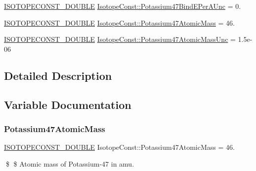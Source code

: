 \begin{DoxyCompactItemize}
\mbox{\hyperlink{group___isotope_const-_macros_ga8f45a7272ce02c0b4c65c44636ed719a}{I\+S\+O\+T\+O\+P\+E\+C\+O\+N\+S\+T\+\_\+\+D\+O\+U\+B\+LE}} \mbox{\hyperlink{group___isotope_const-_potassium-_k47_gac34246af7e8bab4413ad3e28bdc308e8}{Isotope\+Const\+::\+Potassium47\+Bind\+E\+Per\+A\+Unc}} = 0.
\item 
\mbox{\hyperlink{group___isotope_const-_macros_ga8f45a7272ce02c0b4c65c44636ed719a}{I\+S\+O\+T\+O\+P\+E\+C\+O\+N\+S\+T\+\_\+\+D\+O\+U\+B\+LE}} \mbox{\hyperlink{group___isotope_const-_potassium-_k47_ga84aa1ff7506fffd86041f55d348d7e75}{Isotope\+Const\+::\+Potassium47\+Atomic\+Mass}} = 46.
\item 
\mbox{\hyperlink{group___isotope_const-_macros_ga8f45a7272ce02c0b4c65c44636ed719a}{I\+S\+O\+T\+O\+P\+E\+C\+O\+N\+S\+T\+\_\+\+D\+O\+U\+B\+LE}} \mbox{\hyperlink{group___isotope_const-_potassium-_k47_ga80526d0cd2c6d0be10d2cdee913f8df7}{Isotope\+Const\+::\+Potassium47\+Atomic\+Mass\+Unc}} = 1.\+5e-\/06
\end{DoxyCompactItemize}


\subsection{Detailed Description}


\subsection{Variable Documentation}
\mbox{\label{group___isotope_const-_potassium-_k47_ga84aa1ff7506fffd86041f55d348d7e75}} 
\subsubsection{\texorpdfstring{Potassium47\+Atomic\+Mass}{Potassium47AtomicMass}}
{\footnotesize\ttfamily \mbox{\hyperlink{group___isotope_const-_macros_ga8f45a7272ce02c0b4c65c44636ed719a}{I\+S\+O\+T\+O\+P\+E\+C\+O\+N\+S\+T\+\_\+\+D\+O\+U\+B\+LE}} Isotope\+Const\+::\+Potassium47\+Atomic\+Mass = 46.}

\$ \$ Atomic mass of Potassium-\/47 in amu. \mbox{\label{group___isotope_const-_potassium-_k47_ga80526d0cd2c6d0be10d2cdee913f8df7}} 
